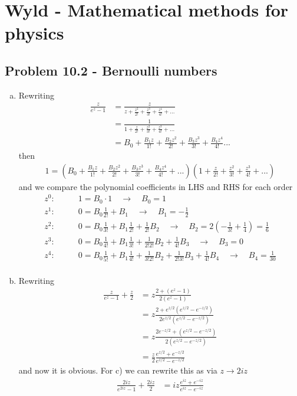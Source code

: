 \documentclass[10pt,a4paper]{book}
\theoremstyle{definition}
\begin{document}
\section{{\sc Wyld} - Mathematical methods for physics}
\subsection{Problem 10.2 - Bernoulli numbers}
\begin{enumerate}[a)]
\item Rewriting
\begin{align}
\frac{z}{e^z-1}
&=\frac{z}{z+\frac{z^2}{2!}+\frac{z^3}{3!}+\frac{z^4}{4!}+...}\\
&=\frac{1}{1+\frac{z}{2!}+\frac{z^2}{3!}+\frac{z^3}{4!}+...}\\
&=B_0+\frac{B_1z}{1!}+\frac{B_2z^2}{2!}+\frac{B_3z^3}{3!}+\frac{B_4z^4}{4!}...
\end{align}
then
\begin{align}
1=\left(B_0+\frac{B_1z}{1!}+\frac{B_2z^2}{2!}+\frac{B_3z^3}{3!}+\frac{B_4z^4}{4!}+...\right)\left(1+\frac{z}{2!}+\frac{z^2}{3!}+\frac{z^3}{4!}+...\right)
\end{align}
and we compare the polynomial coefficients in LHS and RHS for each order
\begin{align}
z^0:&\qquad 1=B_0\cdot1\quad\rightarrow\quad B_0=1\\
z^1:&\qquad 0=B_0\frac{1}{2!}+B_1\quad\rightarrow\quad B_1=-\frac{1}{2}\\
z^2:&\qquad 0=B_0\frac{1}{3!}+B_1\frac{1}{2!}+\frac{1}{2!}B_2\quad\rightarrow\quad B_2=2\left(-\frac{1}{3!}+\frac{1}{4}\right)=\frac{1}{6}\\
z^3:&\qquad 0=B_0\frac{1}{4!}+B_1\frac{1}{3!}+\frac{1}{2!2!}B_2+\frac{1}{4!}B_3\quad\rightarrow\quad B_3=0\\
z^4:&\qquad 0=B_0\frac{1}{5!}+B_1\frac{1}{4!}+\frac{1}{3!2!}B_2+\frac{1}{2!3!}B_3+\frac{1}{4!}B_4\quad\rightarrow\quad B_4=\frac{1}{30}\\
\end{align}
\item Rewriting
\begin{align}
\frac{z}{e^z-1}+\frac{z}{2}
&=z\frac{2+(e^z-1)}{2(e^z-1)}\\
&=z\frac{2+e^{z/2}(e^{z/2}-e^{-z/2})}{2e^{z/2}(e^{z/2}-e^{-z/2})}\\
&=z\frac{2e^{-z/2}+(e^{z/2}-e^{-z/2})}{2(e^{z/2}-e^{-z/2})}\\
&=\frac{z}{2}\frac{e^{z/2}+e^{-z/2}}{e^{z/2}-e^{-z/2}}
\end{align}
and now it is obvious. For c) we can rewrite this as via $z\rightarrow2iz$
\begin{align}
\frac{2iz}{e^{2iz}-1}+\frac{2iz}{2}&=iz\frac{e^{iz}+e^{-iz}}{e^{iz}-e^{-iz}}
\end{align} 
  

\end{enumerate}
\end{document}
